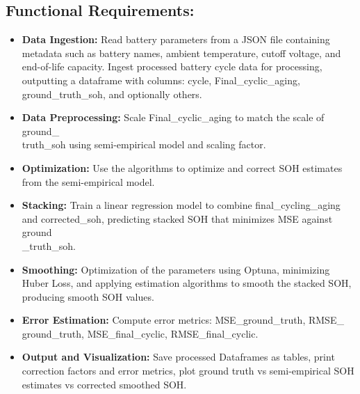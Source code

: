 \subsection{Functional Requirements:}
\begin{itemize}
    \item \textbf{Data Ingestion:} Read battery parameters from a JSON file containing metadata such as battery names, ambient temperature, cutoff voltage, and end-of-life capacity. Ingest processed battery cycle data for processing, outputting a dataframe with columns: cycle, Final\_cyclic\_aging, ground\_truth\_soh, and optionally others.
    \item \textbf{Data Preprocessing:} Scale Final\_cyclic\_aging to match the scale of ground\_\\truth\_soh using semi-empirical model and scaling factor.
    \item \textbf{Optimization:} Use the algorithms to optimize and correct SOH estimates from the semi-empirical model.
    \item \textbf{Stacking:} Train a linear regression model to combine final\_cycling\_aging and corrected\_soh, predicting stacked SOH that minimizes MSE against ground\\\_truth\_soh.
    \item \textbf{Smoothing:} Optimization of the parameters using Optuna, minimizing Huber Loss, and applying estimation algorithms to smooth the stacked SOH, producing smooth SOH values.
    \item \textbf{Error Estimation:} Compute error metrics: MSE\_ground\_truth, RMSE\_\\ground\_truth, MSE\_final\_cyclic, RMSE\_final\_cyclic.
    \item \textbf{Output and Visualization:} Save processed Dataframes as tables, print correction factors and error metrics, plot ground truth vs semi-empirical SOH estimates vs corrected smoothed SOH.
\end{itemize}

